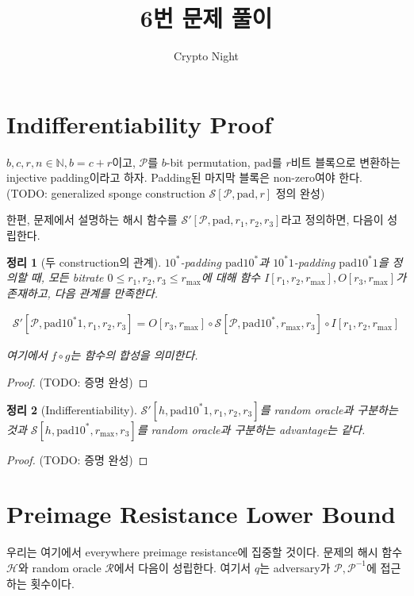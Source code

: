 \documentclass{article}
\title{6번 문제 풀이}
\author{Crypto Night}
\newtheorem{theorem}{정리}
\begin{document}
  \maketitle

  \section{Indifferentiability Proof}
  \(b, c, r, n \in \mathbb{N}, b = c + r\)이고, \(\mathcal{P}\)를 \(b\)-bit permutation, \(\mathrm{pad}\)를 \(r\)비트 블록으로 변환하는 injective padding이라고 하자. Padding된 마지막 블록은 non-zero여야 한다.
  (TODO: generalized sponge construction \(\mathcal{S}[\mathcal{P}, \mathrm{pad}, r]\)  정의 완성)

  한편, 문제에서 설명하는 해시 함수를 \(\mathcal{S}'[\mathcal{P}, \mathrm{pad}, r_1, r_2, r_3]\)라고 정의하면, 다음이 성립한다.

  \begin{theorem}[두 construction의 관계]
    \(10^*\)-padding \(\mathrm{pad10^*}\)과 \(10^*1\)-padding \(\mathrm{pad10^*1}\)을 정의할 때, 모든 bitrate \(0 \leq r_1, r_2, r_3 \leq r_\mathrm{max}\)에 대해 함수 \(I[r_1, r_2, r_\mathrm{max}], O[r_3, r_\mathrm{max}]\)가 존재하고, 다음 관계를 만족한다.

    \begin{align*}
      \mathcal{S}'[\mathcal{P}, \mathrm{pad10^*1}, r_1, r_2, r_3] = O[r_3, r_\mathrm{max}] \circ \mathcal{S}[\mathcal{P}, \mathrm{pad10^*}, r_\mathrm{max}, r_3] \circ I[r_1, r_2, r_\mathrm{max}]
    \end{align*}

    여기에서 \(f \circ g\)는 함수의 합성을 의미한다.
  \end{theorem}
  \begin{proof}
    (TODO: 증명 완성)
  \end{proof}

  \begin{theorem}[Indifferentiability]
    \(\mathcal{S}'[h, \mathrm{pad10^*1}, r_1, r_2, r_3]\)를 random oracle과 구분하는 것과 \(\mathcal{S}[h, \mathrm{pad10^*}, r_\mathrm{max}, r_3]\)를 random oracle과 구분하는 advantage는 같다.
  \end{theorem}
  \begin{proof}
    (TODO: 증명 완성)
  \end{proof}

  \section{Preimage Resistance Lower Bound}
  우리는 여기에서 everywhere preimage resistance에 집중할 것이다.\cite{rogaway_cryptographic_2004} 문제의 해시 함수 \(\mathcal{H}\)와 random oracle \(\mathcal{R}\)에서 다음이 성립한다.\cite{andreeva_security_2011} 여기서 \(q\)는 adversary가 \(\mathcal{P}, \mathcal{P}^{-1}\)에 접근하는 횟수이다.
\end{document}
